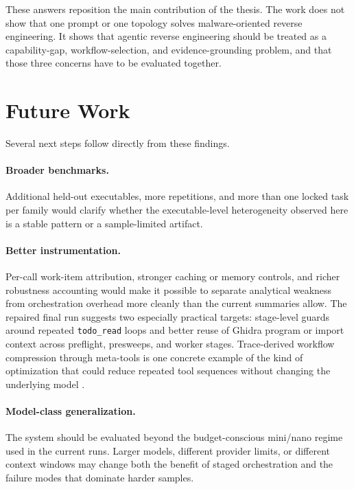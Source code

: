 These answers reposition the main contribution of the thesis. The work does not show that one prompt or one topology solves malware-oriented reverse engineering. It shows that agentic reverse engineering should be treated as a capability-gap, workflow-selection, and evidence-grounding problem, and that those three concerns have to be evaluated together.

\section{Future Work}

Several next steps follow directly from these findings.

\paragraph{Broader benchmarks.} Additional held-out executables, more repetitions, and more than one locked task per family would clarify whether the executable-level heterogeneity observed here is a stable pattern or a sample-limited artifact.

\paragraph{Better instrumentation.} Per-call work-item attribution, stronger caching or memory controls, and richer robustness accounting would make it possible to separate analytical weakness from orchestration overhead more cleanly than the current summaries allow. The repaired final run suggests two especially practical targets: stage-level guards around repeated \texttt{todo\_read} loops and better reuse of Ghidra program or import context across preflight, presweeps, and worker stages. Trace-derived workflow compression through meta-tools is one concrete example of the kind of optimization that could reduce repeated tool sequences without changing the underlying model \cite{abuzakuk2026optimizingagenticworkflowsusing}.

\paragraph{Model-class generalization.} The system should be evaluated beyond the budget-conscious mini/nano regime used in the current runs. Larger models, different provider limits, or different context windows may change both the benefit of staged orchestration and the failure modes that dominate harder samples.

